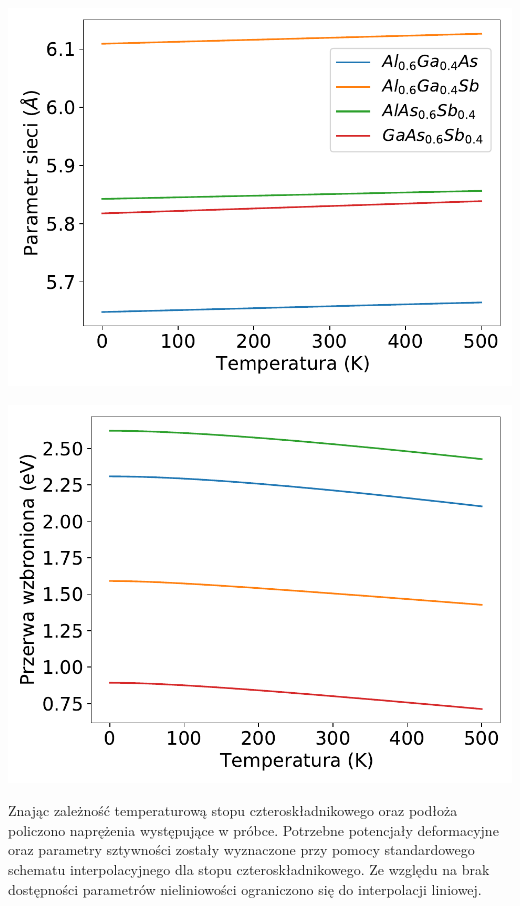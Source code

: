 \documentclass[12pt,openany,a4paper]{book}
\begin{document}
\begin{minipage}[t]{0.5\textwidth}
	\includegraphics[width = \linewidth]{Figures/strain/ter_alc2.pdf}\label{fig:ter_alc1}
\end{minipage}
\begin{minipage}[t]{0.5\textwidth}
	\includegraphics[width = \linewidth]{Figures/strain/ter_eg2.pdf}\label{fig:ter_eg2}
\end{minipage}
\begin{center}
\end{center}

Znając zależność temperaturową stopu czteroskładnikowego oraz podłoża policzono
naprężenia występujące w próbce. Potrzebne potencjały deformacyjne oraz parametry sztywności
zostały wyznaczone przy pomocy standardowego schematu interpolacyjnego dla stopu czteroskładnikowego.
Ze względu na brak dostępności parametrów nieliniowości ograniczono się do interpolacji liniowej.
\end{document}
